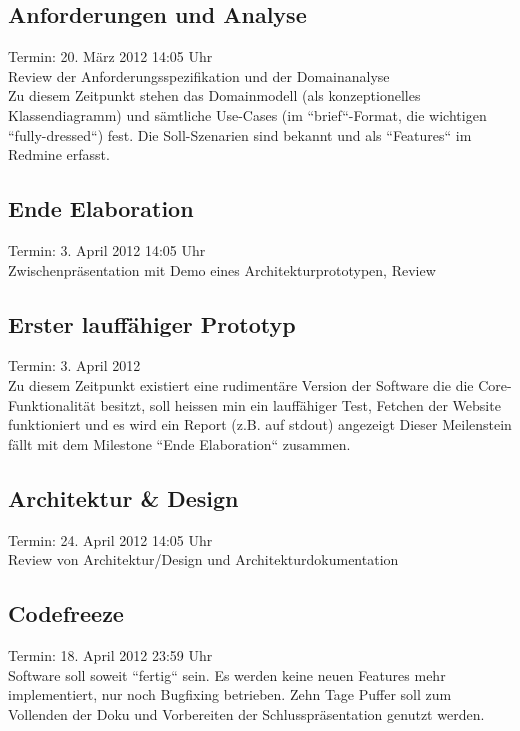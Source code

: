 \subsection{Anforderungen und Analyse}
Termin: 20. März 2012 14:05 Uhr \\
Review der Anforderungsspezifikation und der Domainanalyse\\
Zu diesem Zeitpunkt stehen das Domainmodell (als konzeptionelles Klassendiagramm) und sämtliche Use-Cases (im ``brief``-Format, die wichtigen ``fully-dressed``) fest. Die Soll-Szenarien sind bekannt und als ``Features`` im Redmine erfasst.
\subsection{Ende Elaboration}
\label{text:milestone3}
Termin: 3. April 2012 14:05 Uhr \\
Zwischenpräsentation mit Demo eines Architekturprototypen, Review\\

\subsection{Erster lauffähiger Prototyp}
Termin: 3. April 2012 \\
Zu diesem Zeitpunkt existiert eine rudimentäre Version der Software die die Core-Funktionalität besitzt, soll heissen min ein lauffähiger Test, Fetchen der Website funktioniert und es wird ein Report (z.B. auf stdout) angezeigt
Dieser Meilenstein fällt mit dem Milestone ``Ende Elaboration`` zusammen.

\subsection{Architektur \& Design}
\label{text:architecture}
Termin: 24. April 2012 14:05 Uhr \\
Review von Architektur/Design und Architekturdokumentation\\

\subsection{Codefreeze}
\label{text:milestone4}
Termin: 18. April 2012 23:59 Uhr \\
Software soll soweit ``fertig`` sein. Es werden keine neuen Features mehr implementiert, nur noch Bugfixing betrieben. Zehn Tage Puffer soll zum Vollenden der Doku und Vorbereiten der Schlusspräsentation genutzt werden.

